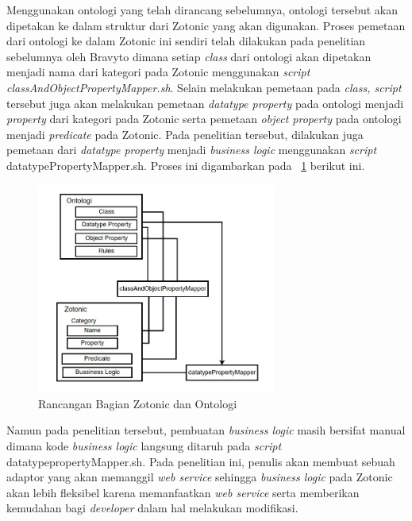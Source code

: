 Menggunakan ontologi yang telah dirancang sebelumnya, ontologi tersebut akan dipetakan ke dalam struktur dari Zotonic yang akan digunakan. Proses pemetaan dari ontologi ke dalam Zotonic ini sendiri telah dilakukan pada penelitian sebelumnya oleh Bravyto dimana setiap \textit{class} dari ontologi akan dipetakan menjadi nama dari kategori pada Zotonic menggunakan \textit{script classAndObjectPropertyMapper.sh}. Selain melakukan pemetaan pada \textit{class, script} tersebut juga akan melakukan pemetaan \textit{datatype property} pada ontologi menjadi \textit{property} dari kategori pada Zotonic serta pemetaan \textit{object property} pada ontologi menjadi \textit{predicate} pada Zotonic. Pada penelitian tersebut, dilakukan juga pemetaan dari \textit{datatype property} menjadi \textit{business logic} menggunakan \textit{script} datatypePropertyMapper.sh. Proses ini digambarkan pada \pic~\ref{fig:ZotonicRoadmap} berikut ini.

\begin{figure}
	\centering
	\includegraphics[width=0.7\textwidth]
	{pics/partZotonicRoadmap.jpg}
	\caption{Rancangan Bagian Zotonic dan Ontologi}
	\label{fig:ZotonicRoadmap}
\end{figure}
\vspace{-0.3cm}

Namun pada penelitian tersebut, pembuatan \textit{business logic} masih bersifat manual dimana kode \textit{business logic} langsung ditaruh pada \textit{script} datatypepropertyMapper.sh. Pada penelitian ini, penulis akan membuat sebuah adaptor yang akan memanggil \textit{web service} sehingga \textit{business logic} pada Zotonic akan lebih fleksibel karena memanfaatkan \textit{web service} serta memberikan kemudahan bagi \textit{developer} dalam hal melakukan modifikasi.
